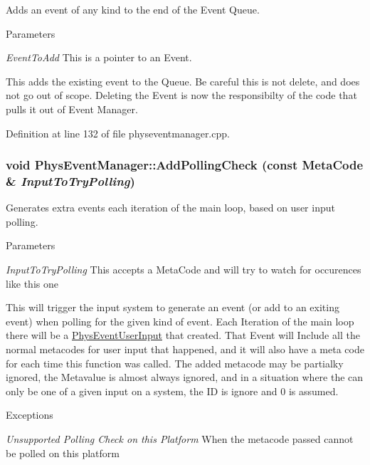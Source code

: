 Adds an event of any kind to the end of the Event Queue. 


\begin{DoxyParams}{Parameters}
\item[{\em EventToAdd}]This is a pointer to an Event.\end{DoxyParams}
This adds the existing event to the Queue. Be careful this is not delete, and does not go out of scope. Deleting the Event is now the responsibilty of the code that pulls it out of Event Manager. 

Definition at line 132 of file physeventmanager.cpp.

\hypertarget{classPhysEventManager_a1e99385441c5377a741561db581ef3ae}{
\subsubsection[{AddPollingCheck}]{\setlength{\rightskip}{0pt plus 5cm}void PhysEventManager::AddPollingCheck (const {\bf MetaCode} \& {\em InputToTryPolling})}}
\label{d5/dd7/classPhysEventManager_a1e99385441c5377a741561db581ef3ae}


Generates extra events each iteration of the main loop, based on user input polling. 


\begin{DoxyParams}{Parameters}
\item[{\em InputToTryPolling}]This accepts a MetaCode and will try to watch for occurences like this one\end{DoxyParams}
This will trigger the input system to generate an event (or add to an exiting event) when polling for the given kind of event. Each Iteration of the main loop there will be a \hyperlink{classPhysEventUserInput}{PhysEventUserInput} that created. That Event will Include all the normal metacodes for user input that happened, and it will also have a meta code for each time this function was called. The added metacode may be partialky ignored, the Metavalue is almost always ignored, and in a situation where the can only be one of a given input on a system, the ID is ignore and 0 is assumed. 
\begin{DoxyExceptions}{Exceptions}
\item[{\em Unsupported Polling Check on this Platform}]When the metacode passed cannot be polled on this platform \end{DoxyExceptions}


